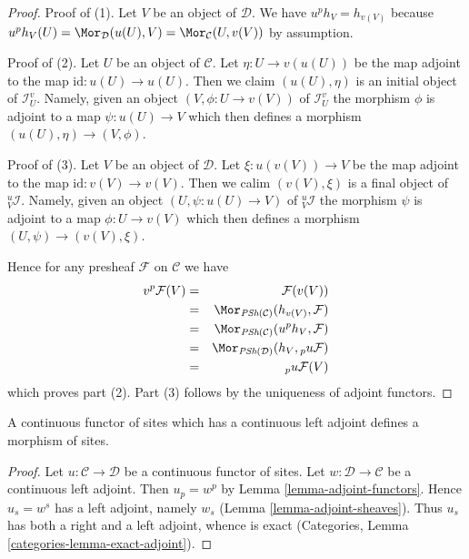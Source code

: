 \begin{proof}
Proof of (1). Let $V$ be an object of $\mathcal{D}$. We have
$u^ph_V = h_{v(V)}$ because
$u^ph_V(U) = \Mor_\mathcal{D}(u(U), V) = \Mor_\mathcal{C}(U, v(V))$
by assumption.

\medskip\noindent
Proof of (2). Let $U$ be an object of $\mathcal{C}$. Let
$\eta : U \to v(u(U))$ be the map adjoint to the map
$\text{id} : u(U) \to u(U)$. Then we claim $(u(U), \eta)$
is an initial object of $\mathcal{I}_U^v$. Namely, given
an object $(V, \phi : U \to v(V))$ of $\mathcal{I}_U^v$
the morphism $\phi$ is adjoint to a map $\psi : u(U) \to V$
which then defines a morphism $(u(U), \eta) \to (V, \phi)$.

\medskip\noindent
Proof of (3). Let $V$ be an object of $\mathcal{D}$. Let
$\xi : u(v(V)) \to V$ be the map adjoint to the map
$\text{id} : v(V) \to v(V)$. Then we calim $(v(V), \xi)$
is a final object of ${}_V^u\mathcal{I}$. Namely, given
an object $(U, \psi : u(U) \to V)$ of ${}_V^u\mathcal{I}$
the morphism $\psi$ is adjoint to a map $\phi : U \to v(V)$
which then defines a morphism $(U, \psi) \to (v(V), \xi)$.

\medskip\noindent
Hence for any presheaf $\mathcal{F}$ on $\mathcal{C}$ we have
\begin{eqnarray*}
v^p\mathcal{F}(V)
& = &
\mathcal{F}(v(V)) \\
& = &
\Mor_{\textit{PSh}(\mathcal{C})}(h_{v(V)}, \mathcal{F}) \\
& = &
\Mor_{\textit{PSh}(\mathcal{C})}(u^ph_V, \mathcal{F}) \\
& = &
\Mor_{\textit{PSh}(\mathcal{D})}(h_V, {}_pu\mathcal{F}) \\
& = &
{}_pu\mathcal{F}(V)
\end{eqnarray*}
which proves part (2). Part (3) follows by the uniqueness of adjoint functors.
\end{proof}

\begin{lemma}
\label{lemma-continuous-with-continuous-left-adjoint}
A continuous functor of sites which has a continuous left adjoint
defines a morphism of sites.
\end{lemma}

\begin{proof}
Let $u : \mathcal{C} \to \mathcal{D}$ be a continuous functor of sites.
Let $w : \mathcal{D} \to \mathcal{C}$ be a continuous left adjoint.
Then $u_p = w^p$ by Lemma \ref{lemma-adjoint-functors}.
Hence $u_s = w^s$ has a left adjoint, namely $w_s$
(Lemma \ref{lemma-adjoint-sheaves}). Thus $u_s$ has both a right and a
left adjoint, whence is exact
(Categories, Lemma \ref{categories-lemma-exact-adjoint}).
\end{proof}




